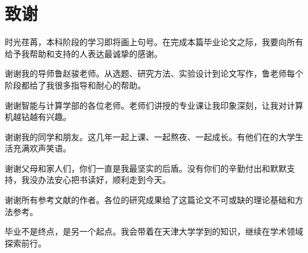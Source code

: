\chapter*{致\quad 谢}

时光荏苒，本科阶段的学习即将画上句号。在完成本篇毕业论文之际，我要向所有给予我帮助和支持的人表达最诚挚的感谢。

谢谢我的导师鲁赵骏老师。从选题、研究方法、实验设计到论文写作，鲁老师每个阶段都给了我很多指导和耐心的帮助。

谢谢智能与计算学部的各位老师。老师们讲授的专业课让我印象深刻，让我对计算机越钻越有兴趣。

谢谢我的同学和朋友。这几年一起上课、一起熬夜、一起成长。有他们在的大学生活充满欢声笑语。

谢谢父母和家人们，你们一直是我最坚实的后盾。没有你们的辛勤付出和默默支持，我没办法安心把书读好，顺利走到今天。

谢谢所有参考文献的作者。各位的研究成果给了这篇论文不可或缺的理论基础和方法参考。

毕业不是终点，是另一个起点。我会带着在天津大学学到的知识，继续在学术领域探索前行。